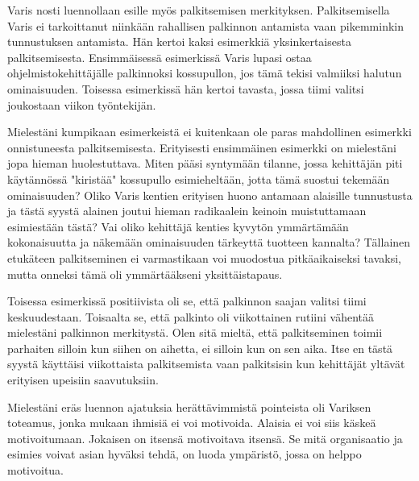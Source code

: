 \documentclass[a4paper]{article}
\begin{document}
Varis nosti luennollaan esille myös palkitsemisen merkityksen. Palkitsemisella Varis ei tarkoittanut niinkään rahallisen palkinnon antamista vaan pikemminkin tunnustuksen antamista. Hän kertoi kaksi esimerkkiä yksinkertaisesta palkitsemisesta. Ensimmäisessä esimerkissä Varis lupasi ostaa ohjelmistokehittäjälle palkinnoksi kossupullon, jos tämä tekisi valmiiksi halutun ominaisuuden. Toisessa esimerkissä hän kertoi tavasta, jossa tiimi valitsi joukostaan viikon työntekijän.

Mielestäni kumpikaan esimerkeistä ei kuitenkaan ole paras mahdollinen esimerkki onnistuneesta palkitsemisesta. Erityisesti ensimmäinen esimerkki on mielestäni jopa hieman huolestuttava. Miten pääsi syntymään tilanne, jossa kehittäjän piti käytännössä "kiristää" kossupullo esimieheltään, jotta tämä suostui tekemään ominaisuuden? Oliko Varis kentien erityisen huono antamaan alaisille tunnustusta ja tästä syystä alainen joutui hieman radikaalein keinoin muistuttamaan esimiestään tästä? Vai oliko kehittäjä kenties kyvytön ymmärtämään kokonaisuutta ja näkemään ominaisuuden tärkeyttä tuotteen kannalta? Tällainen etukäteen palkitseminen ei varmastikaan voi muodostua pitkäaikaiseksi tavaksi, mutta onneksi tämä oli ymmärtääkseni yksittäistapaus.

Toisessa esimerkissä positiivista oli se, että palkinnon saajan valitsi tiimi keskuudestaan. Toisaalta se, että palkinto oli viikottainen rutiini vähentää mielestäni palkinnon merkitystä. Olen sitä mieltä, että palkitseminen toimii parhaiten silloin kun siihen on aihetta, ei silloin kun on sen aika. Itse en tästä syystä käyttäisi viikottaista palkitsemista vaan palkitsisin kun kehittäjät yltävät erityisen upeisiin saavutuksiin.

Mielestäni eräs luennon ajatuksia herättävimmistä pointeista oli Variksen toteamus, jonka mukaan ihmisiä ei voi motivoida. Alaisia ei voi siis käskeä motivoitumaan. Jokaisen on itsensä motivoitava itsensä. Se mitä organisaatio ja esimies voivat asian hyväksi tehdä, on luoda ympäristö, jossa on helppo motivoitua.






\end{document}
